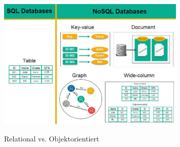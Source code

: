 \begin{figure}[h!]
  \centering
  \includegraphics[width=0.8\textwidth]{pics/database-types.jpg}
  \caption{Relational vs. Objektorientiert}
  \cite{database_types}
\end{figure}